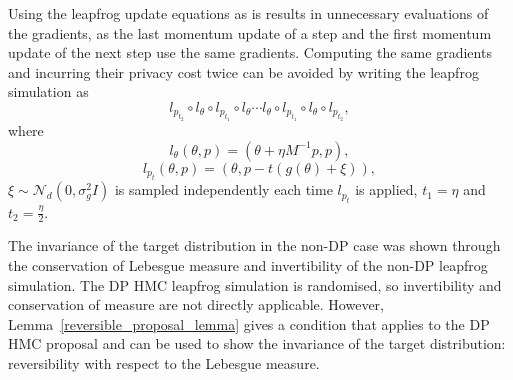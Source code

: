 \documentclass[english,twoside,openright]{HYgraduMLDS}
\newcommand{\caln}{{\mathcal{N}}}
\begin{document}
Using the leapfrog update equations as is results in unnecessary evaluations
of the gradients, as the last momentum update of a step and the first momentum
update of the next step use the same gradients. Computing the same gradients
and incurring their privacy cost
twice can be avoided by writing the leapfrog simulation as
\[
  l_{p_{t_{2}}}\circ l_{\theta}\circ l_{p_{t_{1}}}\circ l_{\theta}\dotsb
  l_{\theta}\circ l_{p_{t_{1}}}\circ l_{\theta}\circ l_{p_{t_{2}}},
\]
where
\[
  l_{\theta}(\theta, p) = (\theta + \eta M^{-1}p, p),
\]
\[
  l_{p_{t}}(\theta, p) = (\theta, p - t(g(\theta) + \xi)),
\]
\(\xi \sim \caln_{d}(0, \sigma_{g}^2I)\) is sampled independently each time
\(l_{p_{t}}\) is applied, \(t_{1} = \eta\) and \(t_{2} = \frac{\eta}{2}\).


%
The invariance of the target distribution in the non-DP case
was shown through the conservation of Lebesgue measure and invertibility of
the non-DP leapfrog simulation. The
DP HMC leapfrog simulation is randomised, so invertibility and conservation
of measure are not directly applicable. However,
Lemma~\ref{reversible_proposal_lemma} gives a condition that applies to
the DP HMC proposal and can be used to show the invariance of the target
distribution: reversibility with respect to the Lebesgue measure.
\end{document}

